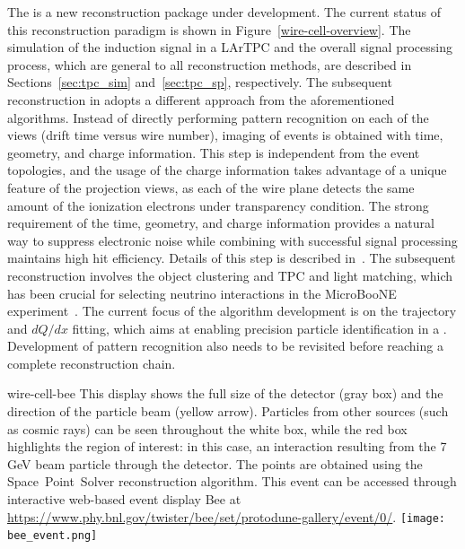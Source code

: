 The  is a new reconstruction package under development. The current 
status of this reconstruction paradigm is shown in Figure~\ref{wire-cell-overview}. The 
simulation of the induction signal in a LArTPC and the overall signal processing process,
which are general to all reconstruction methods, are described in Sections~\ref{sec:tpc_sim} 
and~\ref{sec:tpc_sp}, respectively. The subsequent reconstruction in  adopts 
a different approach from the aforementioned algorithms. Instead of directly performing pattern 
recognition on each of the \twod views (drift time versus wire number), \threed imaging of events 
is obtained with time, geometry, and charge information. This step is independent from 
the event topologies, and the usage of the charge information takes advantage of a unique 
feature of the projection views, as each of the wire plane detects the same 
amount of the ionization electrons under transparency condition. The strong requirement of the time, geometry, and charge 
information provides a natural way to suppress electronic noise
 while combining with successful signal processing maintains high hit efficiency. Details of this step is described in~\cite{Qian:2018qbv}. The subsequent reconstruction involves the object clustering and
TPC and light matching, which has been crucial for selecting neutrino interactions in the 
MicroBooNE experiment~\cite{uboone_wc_note}. The current focus of the  algorithm 
development is on the trajectory and $dQ/dx$ fitting, which aims at enabling precision particle
identification in a \lartpc. %
Development of \threed pattern recognition also needs
to be revisited before reaching a complete reconstruction chain. 

\begin{dunefigure}
{wire-cell-bee}
{This \threed display shows the full size of the  detector (gray box) and 
the direction of the particle beam (yellow arrow). Particles from other sources (such as cosmic rays) 
can be seen throughout the white box, while the red box highlights the region of interest: 
in this case, an interaction resulting from the 7 GeV beam particle through the detector. 
The \threed points are obtained using the Space~Point~Solver reconstruction algorithm. This event
can be accessed through interactive web-based event display Bee at \url{https://www.phy.bnl.gov/twister/bee/set/protodune-gallery/event/0/}.}
\texttt{[image: bee\_event.png]}
\end{dunefigure}



